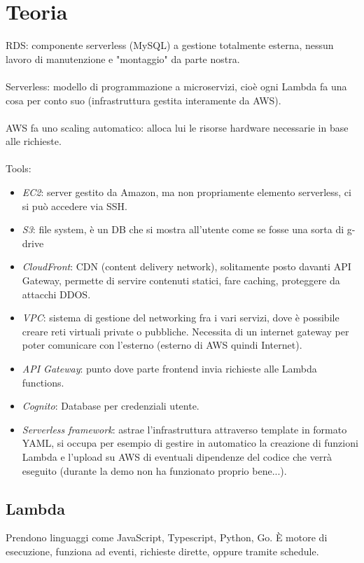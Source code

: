 \documentclass{classes/base}
\begin{document}
    \section*{Teoria}
    RDS: componente serverless (MySQL) a gestione totalmente esterna, nessun lavoro di manutenzione e "montaggio" da parte nostra.
    \\\\
    Serverless: modello di programmazione a microservizi, cioè ogni Lambda fa una cosa per conto suo (infrastruttura gestita interamente da AWS).
    \\\\
    AWS fa uno scaling automatico: alloca lui le risorse hardware necessarie in base alle richieste.
    \\\\
    Tools:
    \begin{itemize}
        \item \textit{EC2}: server gestito da Amazon, ma non propriamente elemento serverless, ci si può accedere via SSH.
        \item \textit{S3}: file system, è un DB che si mostra all'utente come se fosse una sorta di g-drive
        \item \textit{CloudFront}: CDN (content delivery network), solitamente posto davanti API Gateway, permette di servire contenuti statici, fare caching, proteggere da attacchi DDOS.
        \item \textit{VPC}: sistema di gestione del networking fra i vari servizi, dove è possibile creare reti virtuali private o pubbliche. Necessita di un internet gateway per poter comunicare con l'esterno (esterno di AWS quindi Internet).
        \item \textit{API Gateway}: punto dove parte frontend invia richieste alle Lambda functions.
        \item \textit{Cognito}: Database per credenziali utente.
        \item \textit{Serverless framework}: astrae l'infrastruttura attraverso template in formato YAML, si occupa per esempio di gestire in automatico la creazione di funzioni Lambda e l'upload su AWS di eventuali dipendenze del codice che verrà eseguito (durante la demo non ha funzionato proprio bene...).
    \end{itemize}

    \subsection*{Lambda}
    Prendono linguaggi come JavaScript, Typescript, Python, Go.
    È motore di esecuzione, funziona ad eventi, richieste dirette, oppure tramite schedule.
\end{document}
